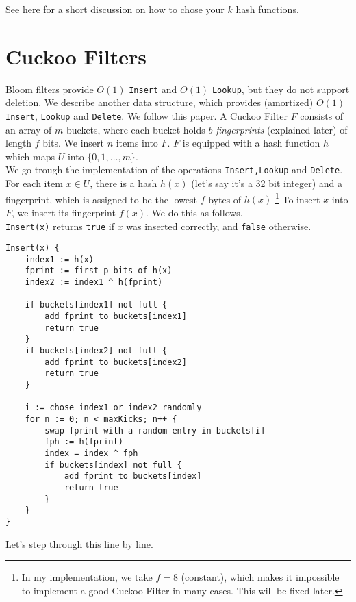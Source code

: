 \documentclass[10pt]{amsart}
\begin{document}
See \href{http://0pointer.net/blog/projects/bloom.html}{here} for a short discussion
on how to chose your $k$ hash functions.

\section{Cuckoo Filters}

Bloom filters provide $O(1)$ \texttt{Insert} and $O(1)$ \texttt{Lookup}, but they
do not support deletion. We describe another data structure, which provides
(amortized) $O(1)$ \texttt{Insert}, \texttt{Lookup} and \texttt{Delete}. We
follow \href{https://www.cs.cmu.edu/~dga/papers/cuckoo-conext2014.pdf}{this paper}.
A Cuckoo Filter $F$ consists of an array of $m$ buckets, where each bucket holds
$b$ \emph{fingerprints} (explained later) of length $f$ bits. We insert $n$ items into $F$.
$F$ is equipped with a hash function $h$ which maps $U$ into $\{0,1,\ldots,m\}$.\\

We go trough the implementation of the operations \texttt{Insert,Lookup} and \texttt{Delete}.\\

For each item $x \in U$, there is a hash $h(x)$ (let's say it's a 32 bit integer)
and a fingerprint, which is assigned to be the lowest $f$ bytes of $h(x)$ \footnote{In my
implementation, we take $f=8$ (constant), which makes it impossible to implement a good
Cuckoo Filter in many cases. This will be fixed later.} To insert $x$ into $F$, we insert
its fingerprint $f(x)$. We do this as follows.\\

\texttt{Insert(x)} returns \texttt{true} if $x$ was inserted correctly, and \texttt{false}
otherwise.
\begin{verbatim}
Insert(x) {
	index1 := h(x)
	fprint := first p bits of h(x)
	index2 := index1 ^ h(fprint)
	
	if buckets[index1] not full {
		add fprint to buckets[index1]
		return true
	}
	if buckets[index2] not full {
		add fprint to buckets[index2]
		return true
	}
	
	i := chose index1 or index2 randomly
	for n := 0; n < maxKicks; n++ {
		swap fprint with a random entry in buckets[i]
		fph := h(fprint)
		index = index ^ fph
		if buckets[index] not full {
			add fprint to buckets[index]
			return true
		}
	}
}
\end{verbatim}

Let's step through this line by line. 
\end{document}
